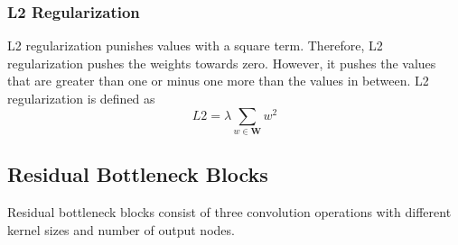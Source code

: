 \subsubsection{L2 Regularization}
L2 regularization punishes values with a square term. Therefore, L2 regularization pushes the weights towards zero. However, it pushes the values that are greater than one or minus one more than the values in between. L2 regularization is defined as
$$ L2 = \lambda \sum_{w \in \mathbf{W}} w^2 $$

\iffalse
\subsection{Residual Bottleneck Blocks}
Residual bottleneck blocks consist of three convolution operations with different kernel sizes and number of output nodes. 

